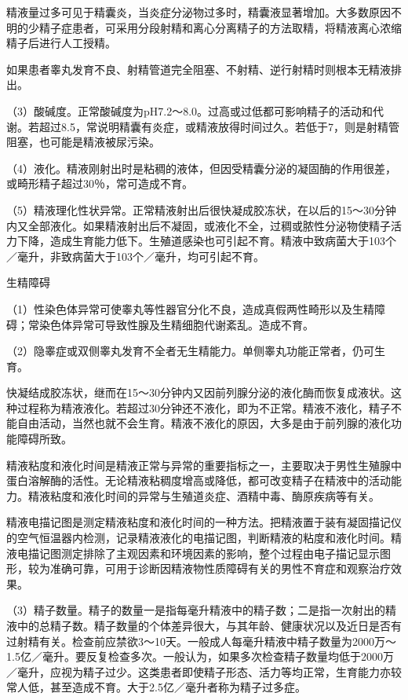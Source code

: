 \documentclass[12pt,UTF8,openany]{ctexbook}
\begin{document}
精液量过多可见于精囊炎，当炎症分泌物过多时，精囊液显著增加。大多数原因不明的少精子症患者，可采用分段射精和离心分离精子的方法取精，将精液离心浓缩精子后进行人工授精。

如果患者睾丸发育不良、射精管道完全阻塞、不射精、逆行射精时则根本无精液排出。

（3）酸碱度。正常酸碱度为pH7.2～8.0。过高或过低都可影响精子的活动和代谢。若超过8.5，常说明精囊有炎症，或精液放得时间过久。若低于7，则是射精管阻塞，也可能是精液被尿污染。

（4）液化。精液刚射出时是粘稠的液体，但因受精囊分泌的凝固酶的作用很差，或畸形精子超过30％，常可造成不育。

（5）精液理化性状异常。正常精液射出后很快凝成胶冻状，在以后的15～30分钟内又全部液化。如果精液射出后不凝固，或液化不全，过稠或脓性分泌物使精子活力下降，造成生育能力低下。生殖道感染也可引起不育。精液中致病菌大于103个／毫升，非致病菌大于103个／毫升，均可引起不育。

生精障碍

（1）性染色体异常可使睾丸等性器官分化不良，造成真假两性畸形以及生精障碍；常染色体异常可导致性腺及生精细胞代谢紊乱。造成不育。

（2）隐睾症或双侧睾丸发育不全者无生精能力。单侧睾丸功能正常者，仍可生育。

快凝结成胶冻状，继而在15～30分钟内又因前列腺分泌的液化酶而恢复成液状。这种过程称为精液液化。若超过30分钟还不液化，即为不正常。精液不液化，精子不能自由活动，当然也就不会生育。精液不液化的原因，大多是由于前列腺的液化功能障碍所致。

精液粘度和液化时间是精液正常与异常的重要指标之一，主要取决于男性生殖腺中蛋白溶解酶的活性。无论精液粘稠度增高或降低，都可改变精子在精液中的活动能力。精液粘度和液化时间的异常与生殖道炎症、酒精中毒、酶原疾病等有关。

精液电描记图是测定精液粘度和液化时间的一种方法。把精液置于装有凝固描记仪的空气恒温器内检测，记录精液液化的电描记图，判断精液的粘度和液化时间。精液电描记图测定排除了主观因素和环境因素的影响，整个过程由电子描记显示图形，较为准确可靠，可用于诊断因精液物性质障碍有关的男性不育症和观察治疗效果。

（3）精子数量。精子的数量一是指每毫升精液中的精子数；二是指一次射出的精液中的总精子数。精子数量的个体差异很大，与其年龄、健康状况以及近日是否有过射精有关。检查前应禁欲3～10天。一般成人每毫升精液中精子数量为2000万～1.5亿／毫升。要反复检查多次。一般认为，如果多次检查精子数量均低于2000万／毫升，应视为精子过少。这类患者即使精子形态、活力等均正常，生育能力亦较常人低，甚至造成不育。大于2.5亿／毫升者称为精子过多症。
\end{document}
